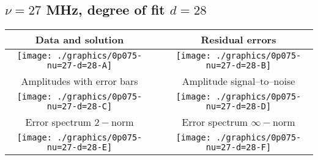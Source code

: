 

% 

\clearpage{}
\break{}

\subsection{$\nu = 27$ MHz, degree of fit $d = 28$}

\begin{table}[h]
    \begin{center}
        \begin{tabular}{ccc}
            Data and solution & \quad & Residual errors \\\hline
            \texttt{[image: ./graphics/0p075-nu=27-d=28-A]} &&
            \texttt{[image: ./graphics/0p075-nu=27-d=28-B]} \\[15pt]
            Amplitudes with error bars && Amplitude signal--to--noise \\\hline
            \texttt{[image: ./graphics/0p075-nu=27-d=28-C]} &&
            \texttt{[image: ./graphics/0p075-nu=27-d=28-D]} \\[15pt]
            Error spectrum $2-$norm && Error spectrum $\infty-$norm \\\hline
            \texttt{[image: ./graphics/0p075-nu=27-d=28-E]} &&
            \texttt{[image: ./graphics/0p075-nu=27-d=28-F]} \\[15pt]
        \end{tabular}
    \end{center}
\label{fig:elev=75, nu=27}
\end{table}



\endinput
